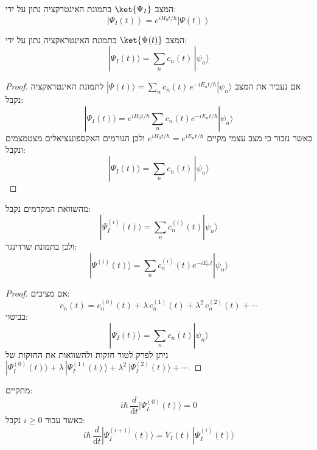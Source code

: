 \documentclass{tstextbook}
\begin{document}
\begin{reminder}
המצב \(\ket{\Psi_{I}}\) בתמונת האינטרקציה נתון על ידי:
$$\left|\Psi_{I}(t)\right\rangle=e^{i H_{0}t/\hbar}\left|\Psi(t)\right\rangle$$

\end{reminder}
\begin{corollary}
המצב \(\ket{\Psi(t)}\) בתמונת האינטראקציה נתון על ידי:
$$|\Psi_{I}(t)\rangle=\sum_{n}c_{n}(t)\,|\psi_{n}\rangle$$

\end{corollary}
\begin{proof}
אם נעביר את המצב \(|\Psi(t)\rangle=\sum_{n}c_{n}(t)\,e^{-i E_{n}t/\hbar}|\psi_{n}\rangle\) לתמונת האינטראקציה נקבל:
$$|\Psi_{I}(t)\rangle=e^{i H_{0}t/\hbar}\sum_{n}c_{n}(t)e^{-i E_{n}t/\hbar}|\psi_{n}\rangle$$
כאשר נזכור כי מצב עצמי מקיים \(e^{iH_{0} t/\hbar}=e^{ iE_{n}t/\hbar }\) ולכן הגורמים האקספוננציאלים מצטמצמים ונקבל:
$$|\Psi_{I}(t)\rangle=\sum_{n}c_{n}(t)\,|\psi_{n}\rangle$$

\end{proof}
\begin{corollary}
מהשוואת המקדמים נקבל:
$$|\Psi_{I}^{(i)}(t)\rangle=\sum_{n}c_{n}^{(i)}(t)|\psi_{n}\rangle$$
ולכן בתמונת שרדינגר:
$$|\Psi^{(i)}(t)\rangle=\sum_{n}c_{n}^{(i)}(t)e^{-i E_{n}t}|\psi_{n}\rangle$$

\end{corollary}
\begin{proof}
אם מציבים:
$$c_{n}(t)=c_{n}^{(0)}(t)+\lambda\,c_{n}^{(1)}(t)+\lambda^{2}\,c_{n}^{(2)}(t)+\cdots$$
בביטוי:
$$|\Psi_{I}(t)\rangle=\sum_{n}c_{n}(t)|\psi_{n}\rangle$$
ניתן לפרק לטור חזקות ולהשוואות את החזקות של \(|\Psi_{I}^{(0)}(t)\rangle+\lambda\,|\Psi_{I}^{(1)}(t)\rangle+\lambda^{2}\,|\Psi_{I}^{(2)}(t)\rangle+\cdots\).

\end{proof}
\begin{proposition}
מתקיים:
$$i\hbar\,\frac{d}{\mathrm{d} t}|\Psi_{I}^{(0)}(t)\rangle=0$$
כאשר עבור \(i\geq 0\) נקבל:
$$i\hbar\,\frac{d}{\mathrm{d} t}|\Psi_{I}^{(i+1)}(t)\rangle=V_{I}(t)\,|\Psi_{I}^{(i)}(t)\rangle$$

\end{proposition}
\end{document}
